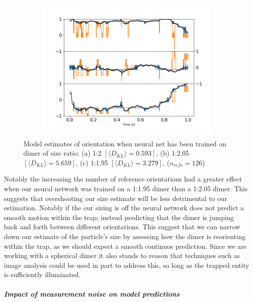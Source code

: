 \begin{figure}[h!]
\begin{subfigure}{0.31\textwidth}
		\includegraphics[width=\textwidth]{fig9c.png}
	\end{subfigure}
	\caption{Model estimates of orientation when neural net has 
		been trained on dimer of size ratio: (a) 1:2 $[\langle D_{KL}\rangle=0.593]$, (b) 1:2.05 $[\langle D_{KL}\rangle
		=5.659]$, (c) 1:1.95 $[\langle D_{KL}\rangle=3.279]$, 
		($n_{refs} = 126$)}
	\label{fig:refs}
\end{figure}

Notably the increasing the number of reference orientations had a greater effect when our neural network was trained on a 1:1.95 dimer than a 1:2.05 dimer. This suggests that overshooting our size estimate will be less detrimental to our estimation. Notably if the our sizing is off the neural network does not predict a smooth motion within the trap; instead predicting that the dimer is jumping back and forth between different orientations. This suggest that we can narrow down our estimate of the particle's size by assessing how the dimer is reorienting within the trap, as we should expect a smooth continuos prediction. Since we are working with a spherical dimer it also stands to reason that techniques such as image analysis could be used in part to address this, so long as the trapped entity is sufficiently illuminated. 
\subparagraph{Impact of measurement noise on model predictions}
\label{sec:epsilon}

